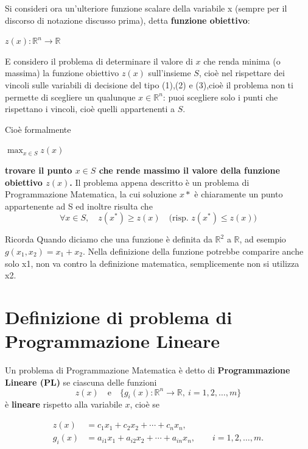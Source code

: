Si consideri ora un'ulteriore funzione scalare della variabile x (sempre per il discorso di notazione discusso prima), detta \textbf{funzione obiettivo}:
\begin{center}
    $z(x) : \mathbb{R} ^ n \to \mathbb{R}$
\end{center}
E considero il problema di determinare il valore di $x$ che renda minima (o massima) la funzione obiettivo $z(x)$ sull'insieme $S$, cioè nel rispettare
dei vincoli sulle variabili di decisione del tipo (1),(2) e (3),cioè il problema non ti permette di scegliere un qualunque \(x\in\mathbb{R}^n\): puoi scegliere solo i punti che rispettano i vincoli, cioè quelli appartenenti a \(S\).


Cioè formalmente
\begin{center}
    $\max_{x \in S} z(x)$
\end{center}
\textbf{trovare il punto \(x\in S\) che rende massimo il valore della funzione obiettivo \(z(x)\).} 
Il problema appena descritto è un problema di Programmazione Matematica, la cui soluzione $x*$ è chiaramente un punto appartenente ad S ed
inoltre risulta che
\begin{equation}
    \forall x \in S,\quad z(x^*) \geq z(x) \quad \text{(risp. } z(x^*) \leq z(x)\text{)}
\end{equation}

\begin{warning}{Ricorda}
    Quando diciamo che una funzione è definita da $\mathbb{R}^2$ a $\mathbb{R}$, ad esempio $g(x_1,x_2) = x_1 + x_2$.
    Nella definizione della funzione potrebbe comparire anche solo x1, non va contro la definizione matematica,
    semplicemente non si utilizza x2.
\end{warning}





\section{Definizione di problema di Programmazione Lineare}

Un problema di Programmazione Matematica è detto di \textbf{Programmazione Lineare (PL)} se ciascuna delle funzioni
\[
z(x) \quad \text{e} \quad \{g_i(x) : \mathbb{R}^n \to \mathbb{R},\ i=1,2,\ldots,m\}
\]
è \textbf{lineare} rispetto alla variabile $x$, cioè se

\[
\begin{aligned}
z(x) &= c_1x_1+c_2x_2+\cdots+c_nx_n,\\
g_i(x) &= a_{i1}x_1+a_{i2}x_2+\cdots+a_{in}x_n,
\qquad i=1,2,\ldots,m.
\end{aligned}
\]

